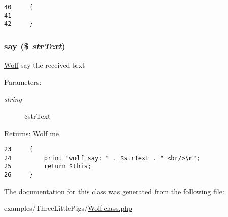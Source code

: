 \begin{Code}\begin{verbatim}40     {
41 
42     }
\end{verbatim}
\end{Code}


\hypertarget{class_wolf_0d2d86aa9b7de45757e2d29384b1e549}{
\subsubsection[{say}]{\setlength{\rightskip}{0pt plus 5cm}say (\$ {\em strText})}}
\label{class_wolf_0d2d86aa9b7de45757e2d29384b1e549}


\hyperlink{class_wolf}{Wolf} say the received text

\begin{Desc}
\item[Parameters:]
\begin{description}
\item[{\em string}]\$strText \end{description}
\end{Desc}
\begin{Desc}
\item[Returns:]\hyperlink{class_wolf}{Wolf} me \end{Desc}


\begin{Code}\begin{verbatim}23     {
24         print "wolf say: " . $strText . " <br/>\n";
25         return $this;
26     }
\end{verbatim}
\end{Code}




The documentation for this class was generated from the following file:\begin{CompactItemize}
\item 
examples/ThreeLittlePigs/\hyperlink{_wolf_8class_8php}{Wolf.class.php}\end{CompactItemize}
